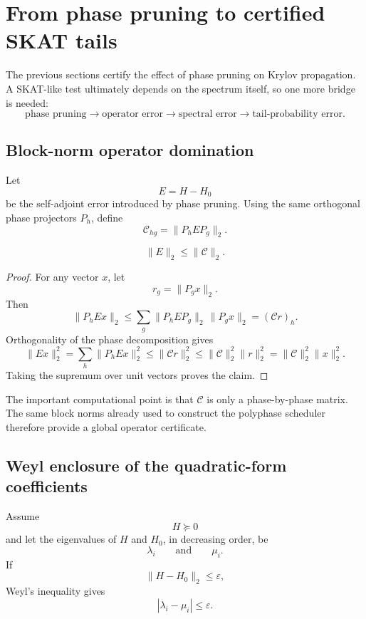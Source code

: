 \section{From phase pruning to certified SKAT tails}

The previous sections certify the effect of phase pruning on Krylov
propagation.  A SKAT-like test ultimately depends on the spectrum itself, so
one more bridge is needed:
\[
\text{phase pruning}
\longrightarrow
\text{operator error}
\longrightarrow
\text{spectral error}
\longrightarrow
\text{tail-probability error}.
\]

\subsection{Block-norm operator domination}

Let
\[
E=H-H_0
\]
be the self-adjoint error introduced by phase pruning.  Using the same
orthogonal phase projectors \(P_h\), define
\[
\mathcal C_{hg}
=
\|P_hEP_g\|_2.
\]

\begin{theorem}
\[
\boxed{
\|E\|_2
\le
\|\mathcal C\|_2.
}
\]
\end{theorem}

\begin{proof}
For any vector \(x\), let
\[
r_g=\|P_gx\|_2.
\]
Then
\[
\|P_hEx\|_2
\le
\sum_g
\|P_hEP_g\|_2\,\|P_gx\|_2
=
(\mathcal C r)_h.
\]
Orthogonality of the phase decomposition gives
\[
\|Ex\|_2^2
=
\sum_h\|P_hEx\|_2^2
\le
\|\mathcal C r\|_2^2
\le
\|\mathcal C\|_2^2\|r\|_2^2
=
\|\mathcal C\|_2^2\|x\|_2^2.
\]
Taking the supremum over unit vectors proves the claim.
\end{proof}

The important computational point is that \(\mathcal C\) is only a
phase-by-phase matrix.  The same block norms already used to construct the
polyphase scheduler therefore provide a global operator certificate.

\subsection{Weyl enclosure of the quadratic-form coefficients}

Assume
\[
H\succeq0
\]
and let the eigenvalues of \(H\) and \(H_0\), in decreasing order, be
\[
\lambda_i
\qquad\text{and}\qquad
\mu_i.
\]
If
\[
\|H-H_0\|_2\le\varepsilon,
\]
Weyl's inequality gives
\[
|\lambda_i-\mu_i|\le\varepsilon.
\]

